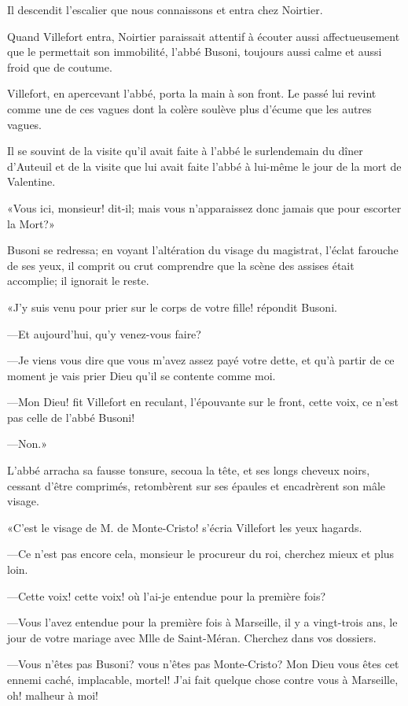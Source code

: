 Il descendit l'escalier que nous connaissons et entra chez Noirtier. 

Quand Villefort entra, Noirtier paraissait attentif à écouter aussi affectueusement que le permettait son immobilité, l'abbé Busoni, toujours aussi calme et aussi froid que de coutume. 

Villefort, en apercevant l'abbé, porta la main à son front. Le passé lui revint comme une de ces vagues dont la colère soulève plus d'écume que les autres vagues. 

Il se souvint de la visite qu'il avait faite à l'abbé le surlendemain du dîner d'Auteuil et de la visite que lui avait faite l'abbé à lui-même le jour de la mort de Valentine. 

«Vous ici, monsieur! dit-il; mais vous n'apparaissez donc jamais que pour escorter la Mort?» 

Busoni se redressa; en voyant l'altération du visage du magistrat, l'éclat farouche de ses yeux, il comprit ou crut comprendre que la scène des assises était accomplie; il ignorait le reste. 

«J'y suis venu pour prier sur le corps de votre fille! répondit Busoni. 

—Et aujourd'hui, qu'y venez-vous faire? 

—Je viens vous dire que vous m'avez assez payé votre dette, et qu'à partir de ce moment je vais prier Dieu qu'il se contente comme moi. 

—Mon Dieu! fit Villefort en reculant, l'épouvante sur le front, cette voix, ce n'est pas celle de l'abbé Busoni! 

—Non.» 

L'abbé arracha sa fausse tonsure, secoua la tête, et ses longs cheveux noirs, cessant d'être comprimés, retombèrent sur ses épaules et encadrèrent son mâle visage. 

«C'est le visage de M. de Monte-Cristo! s'écria Villefort les yeux hagards. 

—Ce n'est pas encore cela, monsieur le procureur du roi, cherchez mieux et plus loin. 

—Cette voix! cette voix! où l'ai-je entendue pour la première fois? 

—Vous l'avez entendue pour la première fois à Marseille, il y a vingt-trois ans, le jour de votre mariage avec Mlle de Saint-Méran. Cherchez dans vos dossiers. 

—Vous n'êtes pas Busoni? vous n'êtes pas Monte-Cristo? Mon Dieu vous êtes cet ennemi caché, implacable, mortel! J'ai fait quelque chose contre vous à Marseille, oh! malheur à moi! 

